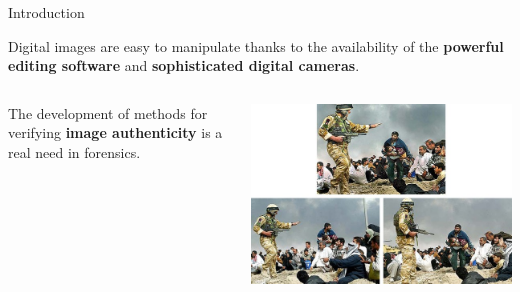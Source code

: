 
\begin{tframe}{Introduction}

\vspace{0.5cm}
Digital images are easy to manipulate thanks to the availability of the \textbf{powerful editing software} and \textbf{sophisticated digital cameras}.

\vspace{1cm}

\begin{minipage}{\textwidth}
\begin{columns}[T]
\begin{column}{0.46\textwidth}
\vspace{0.1cm}
The development of methods for verifying \textbf{image authenticity} is a real need in forensics.

\vspace{0.8cm}
\end{column}
\begin{column}{0.45\textwidth}
\includegraphics[width=1\textwidth]{images/iraq.jpg}
\end{column}
\end{columns}
\end{minipage}

\end{tframe}


